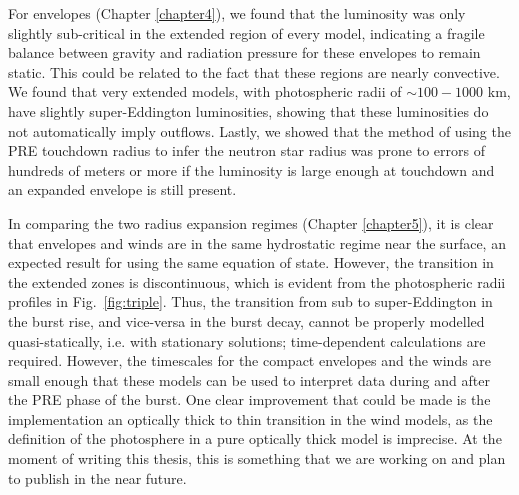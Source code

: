 \documentclass[../main.tex]{subfiles}
\begin{document}
For envelopes (Chapter \ref{chapter4}), we found that the luminosity was only slightly sub-critical in the extended region of every model, indicating a fragile balance between gravity and radiation pressure for these envelopes to remain static. This could be related to the fact that these regions are nearly convective. We found that very extended models, with photospheric radii of ${\sim}100-1000$ km, have slightly super-Eddington luminosities, showing that these luminosities do not automatically imply outflows. Lastly, we showed that the method of using the PRE touchdown radius to infer the neutron star radius was prone to errors of hundreds of meters or more if the luminosity is large enough at touchdown and an expanded envelope is still present. 

In comparing the two radius expansion regimes (Chapter \ref{chapter5}), it is clear that envelopes and winds are in the same hydrostatic regime near the surface, an expected result for using the same equation of state. However, the transition in the extended zones is discontinuous, which is evident from the photospheric radii profiles in Fig.~\ref{fig:triple}. Thus, the transition from sub to super-Eddington in the burst rise, and vice-versa in the burst decay, cannot be properly modelled quasi-statically, i.e. with stationary solutions; time-dependent calculations are required. However, the timescales for the compact envelopes and the winds are small enough that these models can be used to interpret data during and after the PRE phase of the burst. One clear improvement that could be made is the implementation an optically thick to thin transition in the wind models, as the definition of the photosphere in a pure optically thick model is imprecise. At the moment of writing this thesis, this is something that we are working on and plan to publish in the near future. 
\end{document}
